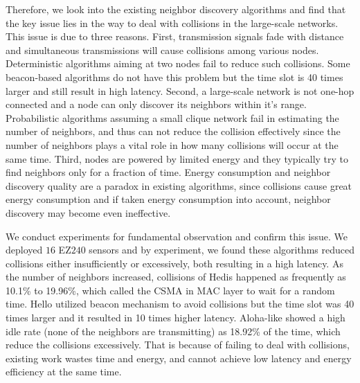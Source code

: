 Therefore, we look into the existing neighbor discovery algorithms and find that the key issue lies in the way to deal with collisions in the large-scale networks. %
This issue is due to three reasons.
First, transmission signals fade with distance and simultaneous transmissions will cause collisions among various nodes. Deterministic algorithms aiming at two nodes \cite{kandhalu2010u, chen2015heterogeneous} fail to reduce such collisions. Some beacon-based algorithms \cite{dutta2008practical, bakht2012searchlight, sun2014hello} do not have this problem but the time slot is 40 times larger and still result in high latency. 
Second, a large-scale network is not one-hop connected and a node can only discover its neighbors within it's range. Probabilistic algorithms \cite{vasudevan2009neighbor, you2011aloha, song2014probabilistic} assuming a small clique network fail in estimating the number of neighbors, and thus can not reduce the collision effectively since the number of neighbors plays a vital role in how many collisions will occur at the same time. 
Third, nodes are powered by limited energy and they typically try to find neighbors only for a fraction of time. Energy consumption and neighbor discovery quality are a paradox in existing algorithms, since collisions cause great energy consumption and if taken energy consumption into account, neighbor discovery may become even ineffective.

We conduct experiments for fundamental observation and confirm this issue. We deployed $16$ EZ$240$ sensors \cite{huang2012easipled} and by experiment, we found these algorithms reduced collisions either insufficiently or excessively, both resulting in a high latency.
As the number of neighbors increased, collisions of Hedis \cite{chen2015heterogeneous} happened as frequently as 10.1\% to 19.96\%, which called the CSMA \cite{bianchi1996performance} in MAC layer to wait for a random time. Hello \cite{sun2014hello} utilized beacon mechanism to avoid collisions but the time slot was 40 times larger and it resulted in 10 times higher latency.  Aloha-like \cite{you2011aloha} showed a high idle rate (none of the neighbors are transmitting) as 18.92\% of the time, which reduce the collisions excessively.  %
That is because of failing to deal with collisions, existing work wastes time and energy, and cannot achieve low latency and energy efficiency at the same time.

